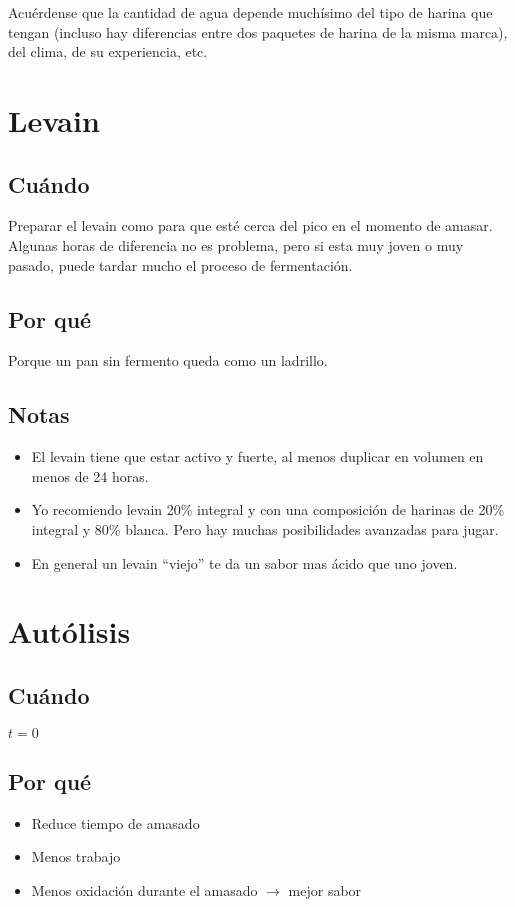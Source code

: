 \documentclass[10pt,a4paper]{article}
\begin{document}
Acuérdense que la cantidad de agua depende muchísimo del tipo de harina que
tengan (incluso hay diferencias entre dos paquetes de harina de la misma marca),
del clima, de su experiencia, etc.

\section{Levain}
\subsection*{Cuándo}
Preparar el levain como para que esté cerca del pico en el momento de amasar.
Algunas horas de diferencia no es problema, pero si esta muy joven o muy pasado,
puede tardar mucho el proceso de fermentación.

\subsection*{Por qué}
Porque un pan sin fermento queda como un ladrillo.

\subsection*{Notas}
\begin{itemize}
\item El levain tiene que estar activo y fuerte, al menos duplicar en
  volumen en menos de 24 horas.
\item Yo recomiendo levain 20\% integral y con una composición de harinas de
  20\% integral y 80\% blanca. Pero hay muchas posibilidades avanzadas para jugar.
\item En general un levain ``viejo'' te da un sabor mas ácido que uno joven.
\end{itemize}

\section{Autólisis}
\subsection*{Cuándo}
$t=0$
\subsection*{Por qué}
\begin{itemize}
\item Reduce tiempo de amasado
\item Menos trabajo
\item Menos oxidación durante el amasado $\rightarrow$ mejor sabor
\end{itemize}
\end{document}
